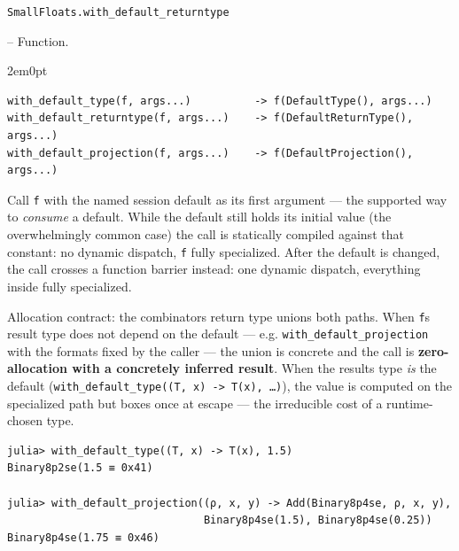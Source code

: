 \par\medskip\noindent\begin{minipage}{\linewidth}
\hypertarget{5478462901931591645}{\texttt{SmallFloats.with\_\allowbreak{}default\_\allowbreak{}returntype}}  -- {Function.}
\nopagebreak
\begin{adjustwidth}{2em}{0pt}


\begin{verbatim}
with_default_type(f, args...)          -> f(DefaultType(), args...)
with_default_returntype(f, args...)    -> f(DefaultReturnType(), args...)
with_default_projection(f, args...)    -> f(DefaultProjection(), args...)
\end{verbatim}

Call \texttt{f} with the named session default as its first argument — the supported way to \emph{consume} a default. While the default still holds its initial value (the overwhelmingly common case) the call is statically compiled against that constant: no dynamic dispatch, \texttt{f} fully specialized. After the default is changed, the call crosses a function barrier instead: one dynamic dispatch, everything inside fully specialized.

Allocation contract: the combinator{\textquotesingle}s return type unions both paths. When \texttt{f}{\textquotesingle}s result type does not depend on the default — e.g. \texttt{with\_\allowbreak{}default\_\allowbreak{}projection} with the formats fixed by the caller — the union is concrete and the call is \textbf{zero-allocation with a concretely inferred result}. When the result{\textquotesingle}s type \emph{is} the default (\texttt{with\_\allowbreak{}default\_\allowbreak{}type(\allowbreak{}(\allowbreak{}T, x) -> T(\allowbreak{}x), …)}), the value is computed on the specialized path but boxes once at escape — the irreducible cost of a runtime-chosen type.


\begin{verbatim}
julia> with_default_type((T, x) -> T(x), 1.5)
Binary8p2se(1.5 ≡ 0x41)

julia> with_default_projection((ρ, x, y) -> Add(Binary8p4se, ρ, x, y),
                               Binary8p4se(1.5), Binary8p4se(0.25))
Binary8p4se(1.75 ≡ 0x46)
\end{verbatim}



\end{adjustwidth}
\end{minipage}
\par\medskip

